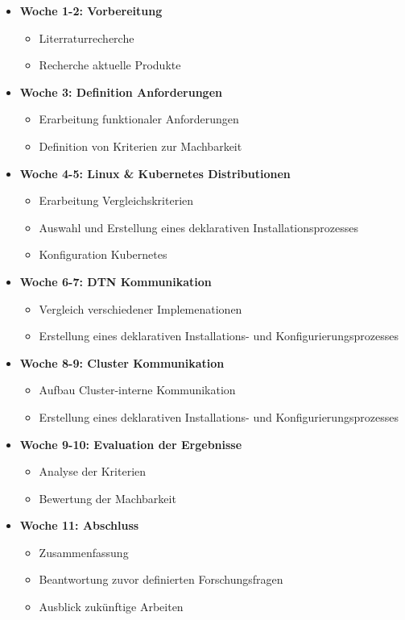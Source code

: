 \documentclass[
  ngerman,
  symmetric,
  cdfont=on,
  numbers=noenddot,
  parskip
]{tudscrreprt}
\begin{document}
\begin{itemize}[label=\textbullet, nosep]
  \item \textbf{Woche 1-2: Vorbereitung}
    \begin{itemize}[label=--]
      \item Literraturrecherche
      \item Recherche aktuelle Produkte
    \end{itemize}

    \item \textbf{Woche 3: Definition Anforderungen}
    \begin{itemize}[label=--]
      \item Erarbeitung funktionaler Anforderungen
      \item Definition von Kriterien zur Machbarkeit
    \end{itemize}

  \item \textbf{Woche 4-5: Linux \& Kubernetes Distributionen}
    \begin{itemize}[label=--]
      \item Erarbeitung Vergleichskriterien
      \item Auswahl und Erstellung eines deklarativen Installationsprozesses
      \item Konfiguration Kubernetes
    \end{itemize}

  \item \textbf{Woche 6-7: DTN Kommunikation}
    \begin{itemize}[label=--]
      \item Vergleich verschiedener Implemenationen
      \item Erstellung eines deklarativen Installations- und Konfigurierungsprozesses
    \end{itemize}

  \item \textbf{Woche 8-9: Cluster Kommunikation}
    \begin{itemize}[label=--]
      \item Aufbau Cluster-interne Kommunikation
      \item Erstellung eines deklarativen Installations- und Konfigurierungsprozesses
    \end{itemize}
  \item \textbf{Woche 9-10: Evaluation der Ergebnisse }
    \begin{itemize}[label=--]
      \item Analyse der Kriterien
      \item Bewertung der Machbarkeit
    \end{itemize}
  \item \textbf{Woche 11: Abschluss}
    \begin{itemize}[label=--]
      \item Zusammenfassung
      \item Beantwortung zuvor definierten Forschungsfragen
      \item Ausblick zukünftige Arbeiten
    \end{itemize}
    
\end{itemize}


\printbibliography
\end{document}
